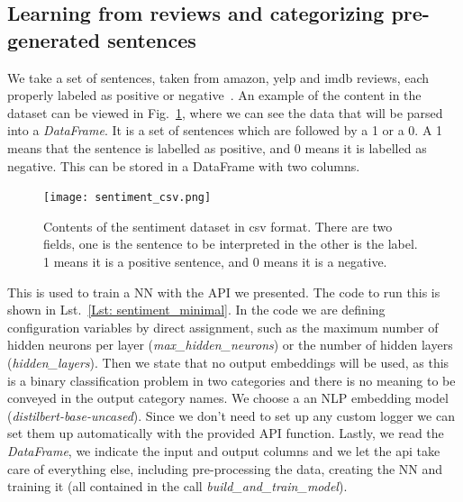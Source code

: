 \documentclass[a4paper, 11pt]{report}
\begin{document}
\subsection{Learning from reviews and categorizing pre-generated sentences}
 We take a set of sentences, taken from amazon, yelp and imdb reviews, each properly labeled as positive or negative~\cite{Dimitrios2015_sentiment_labelled_sentences}.  An example of the content in the dataset can be viewed in Fig.~\ref{fig: sentiment_csv}, where we can see the data that will be parsed into a \textit{DataFrame}. It is a set of sentences which are followed by a 1 or a 0. A 1 means that the sentence is labelled as positive, and 0 means it is labelled as negative. This can be stored in a DataFrame with two columns.

\begin{figure}[ht!]
    \centering
    \texttt{[image: sentiment\_csv.png]}
    \caption[Example contents of a simple dataset]{Contents of the sentiment dataset in csv format. There are two fields, one is the sentence to be interpreted in the other is the label. 1 means it is a positive sentence, and 0 means it is a negative.}
    \label{fig: sentiment_csv}
\end{figure}

This is used to train a NN with the API we presented. The code to run this is shown in Lst.~\ref{Lst: sentiment_minimal}. In the code we are defining configuration variables by direct assignment, such as the maximum number of hidden neurons per layer (\textit{max\_hidden\_neurons}) or the number of hidden layers (\textit{hidden\_layers}). Then we state that no output embeddings will be used, as this is a binary classification problem in two categories and there is no meaning to be conveyed in the output category names. We choose a an NLP embedding model (\textit{distilbert-base-uncased}). Since we don't need to set up any custom logger we can set them up automatically with the provided API function. Lastly, we read the \textit{DataFrame}, we indicate the input and output columns and we let the api take care of everything else, including pre-processing the data, creating the NN and training it (all contained in the call \textit{build\_and\_train\_model}).
\end{document}
